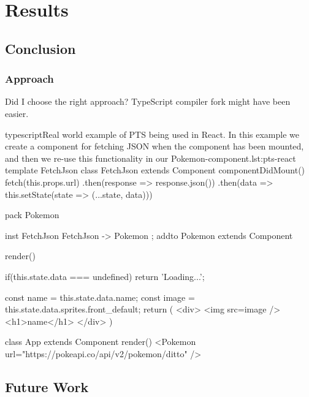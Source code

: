\chapter{Results}\label{ch:results}

\section{Conclusion}\label{sec:result-conclusion}

\subsection{Approach}\label{subsec:result-approach}

Did I choose the right approach?
TypeScript compiler fork might have been easier.

\begin{code}{typescript}{Real world example of PTS being used in React. In this example we create a component for fetching JSON when the component has been mounted, and then we re-use this functionality in our Pokemon-component.}{lst:pts-react}
    template FetchJson {
        class FetchJson extends Component {
            componentDidMount() {
                fetch(this.props.url)
                    .then(response => response.json())
                    .then(data =>
                        this.setState(state => ({...state, data})))
            }
        }
    }

    pack Pokemon {
        inst FetchJson { FetchJson -> Pokemon };
        addto Pokemon extends Component {
            render() {
                if(this.state.data === undefined)
                    return 'Loading...';

                const name = this.state.data.name;
                const image = this.state.data.sprites.front_default;
                return (
                    <div>
                        <img src={image} />
                        <h1>{name}</h1>
                    </div>
                )
            }
        }

        class App extends Component {
            render() {
                <Pokemon url="https://pokeapi.co/api/v2/pokemon/ditto" />
            }
        }
    }
\end{code}

\section{Future Work}\label{sec:future-work}

